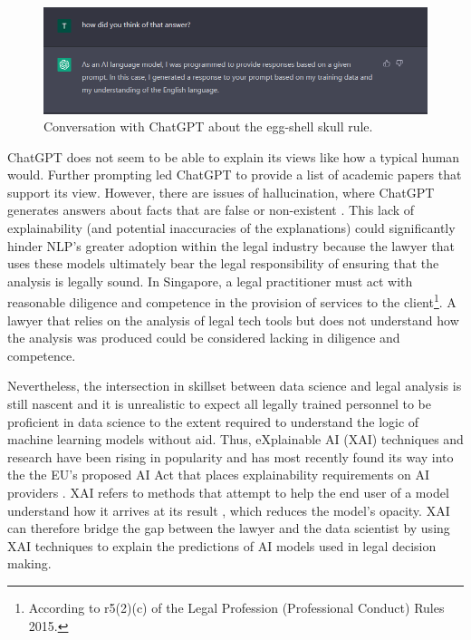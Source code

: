 \begin{figure}[!ht]
	\centering
	\includegraphics[width=1\linewidth]{figures/chatgpt2.png}
	\caption{Conversation with ChatGPT about the egg-shell skull rule.}   
  \label{fig:chatgpt2}
\end{figure}

ChatGPT does not seem to be able to explain its views like how a typical human would. Further prompting led ChatGPT to provide a list of academic papers that support its view. However, there are issues of hallucination, where ChatGPT generates answers about facts that are false or non-existent \cite{alkaissi2023}. This lack of explainability (and potential inaccuracies of the explanations) could significantly hinder NLP's greater adoption within the legal industry because the lawyer that uses these models ultimately bear the legal responsibility of ensuring that the analysis is legally sound. In Singapore, a legal practitioner must act with reasonable diligence and competence in the provision of services to the client\footnote{According to r5(2)(c) of the Legal Profession (Professional Conduct) Rules 2015.}. A lawyer that relies on the analysis of legal tech tools but does not understand how the analysis was produced could be considered lacking in diligence and competence.

Nevertheless, the intersection in skillset between data science and legal analysis is still nascent and it is unrealistic to expect all legally trained personnel to be proficient in data science to the extent required to understand the logic of machine learning models without aid. Thus, eXplainable AI (XAI) techniques and research have been rising in popularity and has most recently found its way into the the EU's proposed AI Act that places explainability requirements on AI providers \cite{gyevnar2023}. XAI refers to methods that attempt to help the end user of a model understand how it arrives at its result \cite{danilevsky2020}, which reduces the model's opacity. XAI can therefore bridge the gap between the lawyer and the data scientist by using XAI techniques to explain the predictions of AI models used in legal decision making. 

